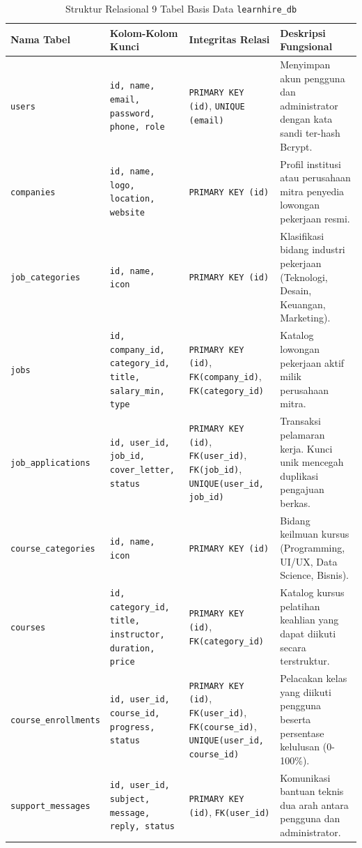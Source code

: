 \documentclass[11pt,a4paper]{article}
\begin{document}
\begin{table}[h!]
\centering
\footnotesize
\begin{tabular}{p{2.5cm} p{3.8cm} p{3.8cm} p{5.5cm}}
\toprule
\textbf{Nama Tabel} & \textbf{Kolom-Kolom Kunci} & \textbf{Integritas Relasi} & \textbf{Deskripsi Fungsional} \\
\midrule
\texttt{users} & \texttt{id, name, email, password, phone, role} & \texttt{PRIMARY KEY (id)}, \texttt{UNIQUE (email)} & Menyimpan akun pengguna dan administrator dengan kata sandi ter-hash Bcrypt. \\
\addlinespace
\texttt{companies} & \texttt{id, name, logo, location, website} & \texttt{PRIMARY KEY (id)} & Profil institusi atau perusahaan mitra penyedia lowongan pekerjaan resmi. \\
\addlinespace
\texttt{job\_categories} & \texttt{id, name, icon} & \texttt{PRIMARY KEY (id)} & Klasifikasi bidang industri pekerjaan (Teknologi, Desain, Keuangan, Marketing). \\
\addlinespace
\texttt{jobs} & \texttt{id, company\_id, category\_id, title, salary\_min, type} & \texttt{PRIMARY KEY (id)}, \texttt{FK(company\_id)}, \texttt{FK(category\_id)} & Katalog lowongan pekerjaan aktif milik perusahaan mitra. \\
\addlinespace
\texttt{job\_applications} & \texttt{id, user\_id, job\_id, cover\_letter, status} & \texttt{PRIMARY KEY (id)}, \texttt{FK(user\_id)}, \texttt{FK(job\_id)}, \texttt{UNIQUE(user\_id, job\_id)} & Transaksi pelamaran kerja. Kunci unik mencegah duplikasi pengajuan berkas. \\
\addlinespace
\texttt{course\_categories} & \texttt{id, name, icon} & \texttt{PRIMARY KEY (id)} & Bidang keilmuan kursus (Programming, UI/UX, Data Science, Bisnis). \\
\addlinespace
\texttt{courses} & \texttt{id, category\_id, title, instructor, duration, price} & \texttt{PRIMARY KEY (id)}, \texttt{FK(category\_id)} & Katalog kursus pelatihan keahlian yang dapat diikuti secara terstruktur. \\
\addlinespace
\texttt{course\_enrollments} & \texttt{id, user\_id, course\_id, progress, status} & \texttt{PRIMARY KEY (id)}, \texttt{FK(user\_id)}, \texttt{FK(course\_id)}, \texttt{UNIQUE(user\_id, course\_id)} & Pelacakan kelas yang diikuti pengguna beserta persentase kelulusan (0-100\%). \\
\addlinespace
\texttt{support\_messages} & \texttt{id, user\_id, subject, message, reply, status} & \texttt{PRIMARY KEY (id)}, \texttt{FK(user\_id)} & Komunikasi bantuan teknis dua arah antara pengguna dan administrator. \\
\bottomrule
\end{tabular}
\caption{Struktur Relasional 9 Tabel Basis Data \texttt{learnhire\_db}}
\end{table}
\end{document}
